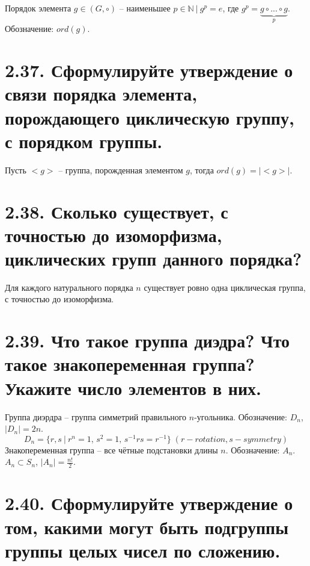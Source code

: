 \documentclass{article}
\begin{document}
Порядок элемента $g \in (G, \circ)$ -- наименьшее $p \in \mathbb{N} \:|\: g^p = e$, где $g^p = \underbrace{g \circ ... \circ g}_{p}$. Обозначение: $ord(g)$.

\section*{\LARGE 2.37. Сформулируйте утверждение о связи порядка элемента, порождающего циклическую группу, с порядком группы.  }

Пусть $<g>$ -- группа, порожденная элементом $g$, тогда $ord(g) = |<g>|$.

\section*{\LARGE 2.38. Сколько существует, с точностью до изоморфизма, циклических групп данного порядка? }

Для каждого натурального порядка $n$ существует ровно одна циклическая группа, с точностью до изоморфизма.

\section*{\LARGE 2.39. Что такое группа диэдра? Что такое знакопеременная группа? Укажите число элементов в них. }

Группа диэрдра -- группа симметрий правильного $n$-угольника. Обозначение: $D_n$, $|D_n| = 2n$.
$$ D_n = \{r, s \:|\: r^n = 1,\, s^2 = 1,\, s^{-1}rs = r^{-1}\} \; (r - rotation, s - symmetry)$$
\newline Знакопеременная группа -- все чётные подстановки длины $n$. Обозначение: $A_n$. $A_n \subset S_n$, $|A_n| = \frac{n!}{2}$.

\section*{\LARGE 2.40. Сформулируйте утверждение о том, какими могут быть подгруппы группы целых чисел по сложению.  }
\end{document}
